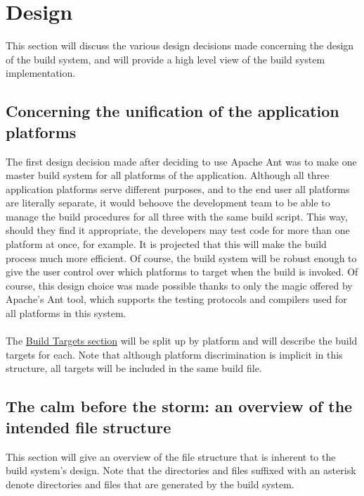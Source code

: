 \documentclass[12pt]{report}
\begin{document}
\section{Design}
This section will discuss the various design decisions made concerning the design of the build
system, and will provide a high level view of the build system implementation.
\subsection{Concerning the unification of the application platforms}
The first design decision made after deciding to use Apache Ant was to make one master build system
for all platforms of the application. Although all three application platforms serve different
purposes, and to the end user all platforms are literally separate, it would behoove the development
team to be able to manage the build procedures for all three with the same build script. This way,
should they find it appropriate, the developers may test code for more than one platform at once,
for example. It is projected that this will make the build process much more efficient. Of course,
the build system will be robust enough to give the user control over which platforms to target when
the build is invoked. Of course, this design choice was made possible thanks to only the magic
offered by Apache's Ant tool, which supports the testing protocols and compilers used for all
platforms in this system.\\\\
The \hyperref[s:build-targets]{Build Targets section} will be split up by platform and will describe
the build targets for each.
Note that although platform discrimination is implicit in this structure, all targets will be
included in the same build file.

\subsection{The calm before the storm: an overview of the intended file structure}
\label{s:build-dirtree}
This section will give an overview of the file structure that is inherent to the build system's
design. Note that the directories and files suffixed with an asterisk denote directories and files
that are generated by the build system.\\\\\
\end{document}

